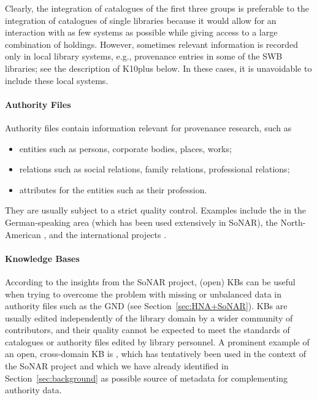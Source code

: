 Clearly, the integration of catalogues of the first three groups is preferable to the integration of catalogues of single libraries
because it would allow for an interaction with as few systems as possible while giving access to a large
combination of holdings. However, sometimes relevant information is recorded only in local library systems,
e.g., provenance entries in some of the \gls{SWB} libraries; see the description of \gls{K10plus} below.
In these cases, it is unavoidable to include these local systems.

\paragraph{Authority Files}
%
Authority files
contain information relevant for provenance research, such as
%
\begin{itemize}
  \item
    entities such as persons, corporate bodies, places, works;
  \item
    relations such as social relations, family relations, professional relations;
  \item
    attributes for the entities such as their profession.
\end{itemize}
%
They are usually subject to a strict quality control.
Examples include the  \autocite{GND} in the German-speaking area (which has been used extensively in \gls{SoNAR}),
the North-American  \autocite{LCNAF},
and the international projects  \autocite{ISNI,VIAF}.

\paragraph{Knowledge Bases}

According to the insights from the \gls{SoNAR} project,
(open) \glspl{KB} can be useful when trying to overcome the problem with missing or unbalanced data
in authority files such as the \gls{GND} (see Section~\ref{sec:HNA+SoNAR}).
\Glspl{KB} are usually edited independently of the library domain by a wider community of contributors,
and their quality cannot be expected to meet the standards of catalogues or authority files edited by library personnel.
A prominent example of an open, cross-domain \gls{KB} is  \autocite{Wikidata},
which has tentatively been used in the context of the \gls{SoNAR} project
and which we have already identified in Section~\ref{sec:background} as possible source of metadata
for complementing authority data.

